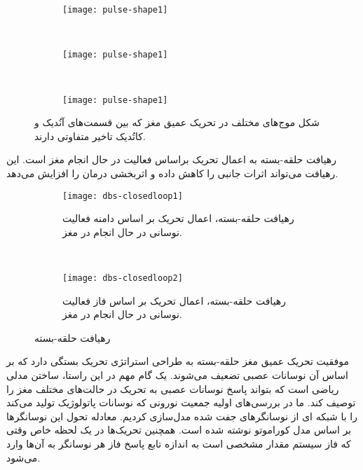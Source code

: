 \begin{figure}
     \centering
     \begin{subfigure}[t]{0.3\textwidth}
         \centering
         \texttt{[image: pulse-shape1]}
     \end{subfigure}
     \
     \begin{subfigure}[t]{0.3\textwidth}
         \centering
         \texttt{[image: pulse-shape1]}
     \end{subfigure}
     \
     \begin{subfigure}[t]{0.3\textwidth}
         \centering
         \texttt{[image: pulse-shape1]}
     \end{subfigure}
        \caption{
شکل موج‌های مختلف در تحریک عمیق مغز که بین قسمت‌های آنُدیک و کاتُدیک تاخیر متفاوتی دارند.
         }
        \label{fig:dbs-pulse-shape}
\end{figure}


رهیافت حلقه-بسته به اعمال تحریک براساس فعالیت در حال انجام مغز است. این رهیافت می‌تواند اثرات جانبی را کاهش داده و اثربخشی درمان را افزایش می‌دهد.


\begin{figure}
     \centering
     \begin{subfigure}[t]{0.45\textwidth}
         \centering
         \texttt{[image: dbs-closedloop1]}
         \caption{
         رهیافت حلقه-بسته، اعمال تحریک بر اساس دامنه فعالیت نوسانی در حال انجام در مغز.
         }
     \end{subfigure}
     \
     \begin{subfigure}[t]{0.45\textwidth}
         \centering
         \texttt{[image: dbs-closedloop2]}
         \caption{
         رهیافت حلقه-بسته، اعمال تحریک بر اساس فاز فعالیت نوسانی در حال انجام در مغز.
         }
     \end{subfigure}
        \caption{
رهیافت حلقه-بسته
         }
        \label{fig:dbs-closed-loop}
\end{figure}

موفقیت تحریک عمیق مغز حلقه-بسته به طراحی استراتژی تحریک بستگی دارد که بر اساس آن نوسانات عصبی تضعیف می‌شوند. یک گام مهم در این راستا، ساختن مدلی ریاضی است که بتواند پاسخ نوسانات عصبی به تحریک در حالت‌های مختلف مغز را توصیف کند.
ما در بررسی‌های اولیه جمعیت نورونی که نوسانات پاتولوژیک تولید می‌کند را با شبکه ای از نوسانگرهای جفت شده مدل‌سازی کردیم. معادله تحول این نوسانگرها بر اساس مدل کوراموتو نوشته شده است. همچنین تحریک‌ها در یک لحظه خاص وقتی که فاز سیستم مقدار مشخصی است به اندازه تابع پاسخ فاز هر نوسانگر به آن‌ها وارد می‌شود.

